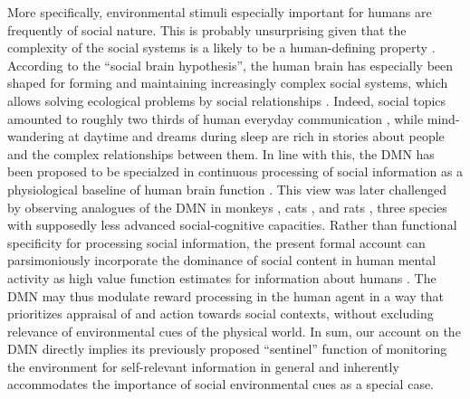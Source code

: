 \documentclass[10pt,letterpaper]{article}
\begin{document}
More specifically,
environmental stimuli especially important for humans are frequently of
social nature. This is probably unsurprising
given that
the complexity of the social systems
is a likely to be a human-defining property
\citep{tomasello2009cultural}.
According to the ``social brain hypothesis'',
the human brain has especially been shaped for
forming and maintaining increasingly complex
social systems,
which allows solving ecological problems by social relationships
\citep{whiten1988machiavellian}.
Indeed, social topics amounted to roughly
two thirds of human everyday communication \citep{dunbar1997human},
while
mind-wandering at daytime and dreams during sleep
are rich in stories about people and
the complex relationships between them.
%
In line with this, the DMN has been proposed to be specialzed in
continuous processing of social information as a
physiological baseline of human brain function
\citep{schilbach2008minds}. This view was later challenged by observing
analogues of the DMN in monkeys \citep{mantini2011default},
cats \citep{popa2009contrasting},
and rats \citep{lu2012rat}, three species with
supposedly less advanced social-cognitive capacities.
Rather than functional specificity for processing social information,
the present formal account can parsimoniously incorporate
the dominance of social content in
human mental activity
as high value function estimates for information about humans
\citep{baker2009action, kampe2001psychology, krienen2010clan}.
The DMN may thus modulate reward processing
in the human agent in a way that prioritizes
appraisal of and action towards social contexts,
without excluding relevance of environmental cues of the physical world.
In sum,
our account on the DMN directly implies
its previously proposed ``sentinel'' function
of monitoring the environment for self-relevant information
in general and
inherently accommodates the importance of social environmental cues
as a special case.
\end{document}
